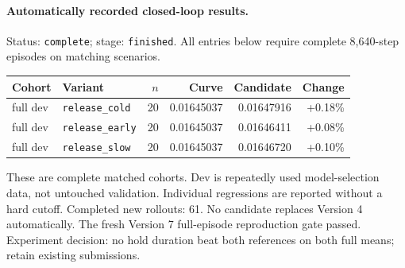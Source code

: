 \paragraph{Automatically recorded closed-loop results.}
Status: \texttt{complete}; stage: \texttt{finished}.
All entries below require complete 8,640-step episodes on matching scenarios.
\begin{center}\small
\begin{tabular}{llrrrr}\toprule
Cohort & Variant & $n$ & Curve & Candidate & Change \\\midrule
full dev & \texttt{release\_cold} & 20 & 0.01645037 & 0.01647916 & +0.18\% \\
full dev & \texttt{release\_early} & 20 & 0.01645037 & 0.01646411 & +0.08\% \\
full dev & \texttt{release\_slow} & 20 & 0.01645037 & 0.01646720 & +0.10\% \\
\bottomrule\end{tabular}\end{center}
These are complete matched cohorts. Dev is repeatedly used model-selection data, not untouched validation. Individual regressions are reported without a hard cutoff.
Completed new rollouts: 61. No candidate replaces Version 4 automatically.
The fresh Version 7 full-episode reproduction gate passed.
Experiment decision: no hold duration beat both references on both full means; retain existing submissions.
